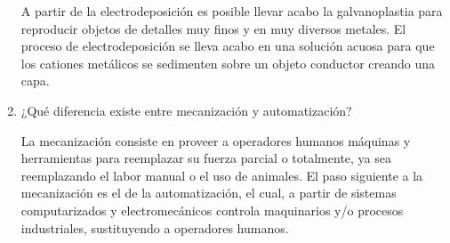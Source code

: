 \documentclass[12pt, letterpaper]{article}
\begin{document}
\begin{enumerate}
		A partir de la electrodeposición es posible llevar acabo la galvanoplastia para reproducir objetos de detalles muy finos y en muy diversos metales. El proceso de electrodeposición se lleva acabo en una solución acuosa para que los cationes metálicos se sedimenten sobre un objeto conductor creando una capa.

	\item ¿Qué diferencia existe entre mecanización y automatización?

		La mecanización consiste en proveer a operadores humanos máquinas y herramientas para reemplazar su fuerza parcial o totalmente, ya sea reemplazando el labor manual o el uso de animales. El paso siguiente a la mecanización es el de la automatización, el cual, a partir de sistemas computarizados y electromecánicos controla maquinarios y/o procesos industriales, sustituyendo a operadores humanos.

\end{enumerate}

\renewcommand\refname{References}
\printbibliography
\end{document}
